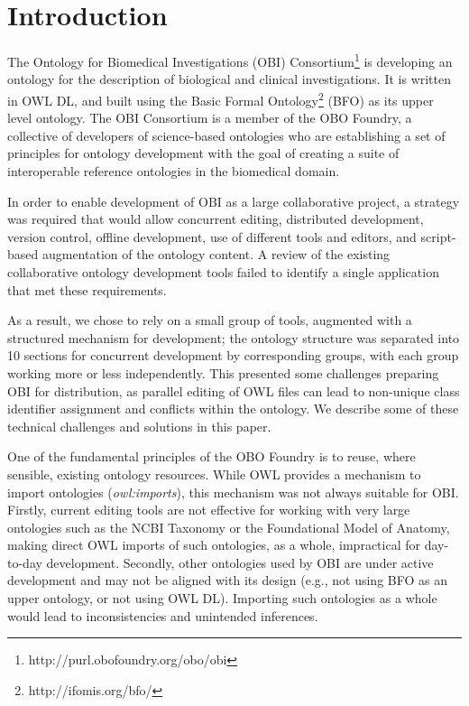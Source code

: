 \documentclass{elsart}       %
\begin{document}
\section{Introduction}
\label{intro}

The Ontology for Biomedical Investigations (OBI) Consortium\footnote{http://purl.obofoundry.org/obo/obi} is developing an ontology for the description of biological and clinical investigations.
It is written in OWL DL, and built using the Basic Formal Ontology\footnote{http://ifomis.org/bfo/} (BFO)\cite{bfo} as its upper level ontology.
The OBI Consortium is a member of the OBO Foundry\cite{foundry}, a collective of developers of science-based ontologies who are establishing a set of principles for ontology development with the goal of creating a suite of interoperable reference ontologies in the biomedical domain. 


In order to enable development of OBI as a large collaborative project, a strategy was required that would allow concurrent editing, distributed development, version control, offline development, use of different tools and editors, and script-based augmentation of the ontology content.
A review of the existing collaborative ontology development tools failed to identify a single application that met these requirements.

As a result, we chose to rely on a small group of tools, augmented with a structured mechanism for development; the ontology structure was separated into 10 sections for concurrent development by corresponding groups, with each group working more or less independently.
This presented some challenges preparing OBI for distribution, as parallel editing of OWL files can lead to non-unique class identifier assignment and conflicts within the ontology. We describe some of these technical challenges and solutions in this paper.

One of the fundamental principles of the OBO Foundry is to reuse, where sensible, existing ontology resources.
While OWL provides a mechanism to import ontologies (\emph{owl:imports}), this mechanism was not always suitable for OBI. Firstly, current editing tools are not effective for working with very large ontologies such as the NCBI Taxonomy\cite{ncbi} or the Foundational Model of Anatomy\cite{fma}, making direct OWL imports of such ontologies, as a whole, impractical for day-to-day development. Secondly, other ontologies used by OBI %
are under active development and may not be aligned with its design (e.g., not using BFO as an upper ontology, or not using OWL DL). Importing such ontologies as a whole would lead to inconsistencies and unintended inferences. 
\end{document}
